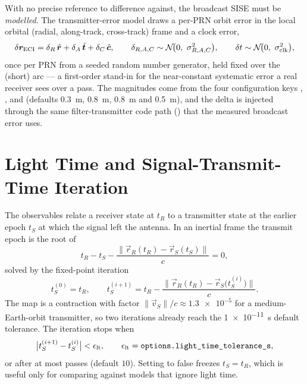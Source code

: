 With no precise reference to difference against, the broadcast SISE must be
\emph{modelled}. The  transmitter-error model draws a
per-PRN orbit error in the local orbital (radial, along-track, cross-track)
frame and a clock error,
\begin{equation}
  \label{eq:gnss-sise}
  \delta\vec{r}_{\mathrm{ECI}}
    = \delta_R\,\uvec{r} + \delta_A\,\uvec{t} + \delta_C\,\uvec{c},
  \qquad
  \delta_{R,A,C} \sim \mathcal{N}\!\bigl(0,\ \sigma_{R,A,C}^2\bigr),
  \qquad
  \delta t \sim \mathcal{N}\!\bigl(0,\ \sigma_{\mathrm{clk}}^2\bigr),
\end{equation}
once per PRN from a seeded random number generator, held fixed over the (short)
arc --- a first-order stand-in for the near-constant systematic error a real
receiver sees over a pass. The magnitudes come from the four configuration
keys ,
,  and 
(defaults \SI{0.3}{\meter}, \SI{0.8}{\meter}, \SI{0.8}{\meter} and
\SI{0.5}{\meter}), and the delta is injected through the same
filter-transmitter code path () that the measured
broadcast error uses.

\section{Light Time and Signal-Transmit-Time Iteration}
\label{sec:gnss-lighttime}

The observables relate a receiver state at $t_R$ to a transmitter state at the
earlier epoch $t_S$ at which the signal left the antenna. In an inertial frame
the transmit epoch is the root of
\begin{equation}
  \label{eq:gnss-lighttime-root}
  t_R - t_S - \frac{\bigl\lVert \vec{r}_R(t_R) - \vec{r}_S(t_S) \bigr\rVert}{c} = 0 ,
\end{equation}
solved by the fixed-point iteration
\begin{equation}
  \label{eq:gnss-lighttime-fixed}
  t_S^{(0)} = t_R, \qquad
  t_S^{(i+1)} = t_R
    - \frac{\bigl\lVert \vec{r}_R(t_R) - \vec{r}_S\bigl(t_S^{(i)}\bigr) \bigr\rVert}{c} .
\end{equation}
The map is a contraction with factor $\lVert \vec{v}_S \rVert / c \approx
\num{1.3e-5}$ for a medium-Earth-orbit transmitter, so two iterations already
reach the \SI{1e-11}{\second} default tolerance. The iteration stops when
\begin{equation}
  \label{eq:gnss-lighttime-stop}
  \bigl| t_S^{(i+1)} - t_S^{(i)} \bigr| < \epsilon_{\mathrm{lt}},
  \qquad \epsilon_{\mathrm{lt}} = \texttt{options.light\_time\_tolerance\_s},
\end{equation}
or after at most
 passes
(default $10$). Setting  to false freezes
$t_S = t_R$, which is useful only for comparing against models that ignore
light time.

